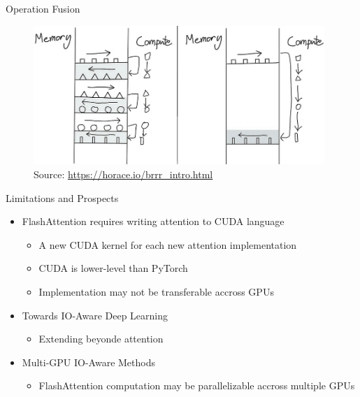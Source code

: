 
\begin{vbframe}{Operation Fusion}

\vfill

\begin{figure}
	\centering
	\includegraphics[width = 11cm]{./figure/op_fusion.png} \\ 
	{\footnotesize Source: \href{https://horace.io/brrr_intro.html}{\url{https://horace.io/brrr_intro.html}}}
\end{figure}

\vfill

\end{vbframe}


\begin{vbframe}{Limitations and Prospects}

\vfill

\begin{itemize}
	\item FlashAttention requires writing attention to CUDA language
	\begin{itemize}
		\item A new CUDA kernel for each new attention implementation
		\item CUDA is lower-level than PyTorch
		\item Implementation may not be transferable accross GPUs
	\end{itemize}
	\item Towards IO-Aware Deep Learning
	\begin{itemize}
		\item Extending beyonde attention
	\end{itemize}
	\item Multi-GPU IO-Aware Methods
	\begin{itemize}
		\item FlashAttention computation may be parallelizable accross multiple GPUs
	\end{itemize}
\end{itemize}

\vfill

\end{vbframe}


\endlecture
